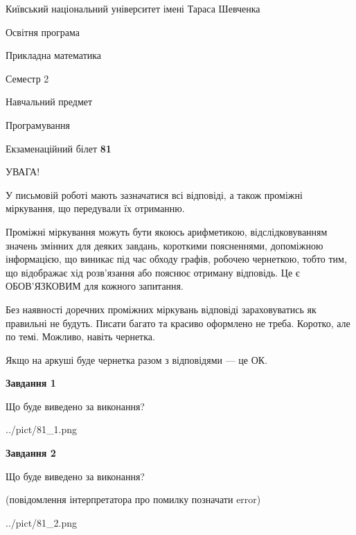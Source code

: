 \documentclass[12pt, ukrainian]{article}
\begin{document}
{{\begin {small}\par
{ \center  Київський національний університет імені Тараса Шевченка \par}
{\parbox {5 cm}{Освітня програма \hfill}{\parbox {7 cm}{Прикладна математика\hfill}}\parbox {6 cm}{\hfill Семестр 2}}\par
{\parbox {5 cm} {Навчальний предмет \hfill}\parbox {7 cm}{Програмування \hfill}\parbox {6cm}{\hfill}\par}\vspace{-7pt} \end{small}}{\center Екзаменаційний білет \No \textbf
{ 81 }\par}}
{
\begin {large}
УВАГА!

У письмовій роботі мають зазначатися всі відповіді, а також проміжні міркування, що передували їх отриманню.

Проміжні міркування можуть бути якоюсь арифметикою, відслідковуванням зна\-чень змінних для деяких завдань,
короткими поясненнями, допоміжною інформацією, що виникає під час обходу графів, робочею чернеткою,
тобто тим, що відображає хід розв’язання або пояснює отриману відповідь.
Це є ОБОВ’ЯЗКОВИМ для кожного запитання.

Без наявності доречних проміжних міркувань відповіді зараховуватись як правиль\-ні не будуть.
Писати багато та красиво оформлено не треба. Коротко, але по темі. Можли\-во, навіть чернетка.

Якщо на аркуші буде чернетка разом з відповідями --- це ОК.

\newpage

{\begin {center}\textbf{Завдання 1}\end {center}}\par
Що буде виведено за виконання?\par
\begin{center}
	{../pict/81_1.png}
\end{center}
\newpage

{\begin {center}\textbf{Завдання 2}\end {center}}\par
Що буде виведено за виконання?\par
 (повідомлення інтерпретатора про помилку позначати error)\par
\begin{center}
	{../pict/81_2.png}
\end{center}
\newpage


\end{large}}
\end{document}
